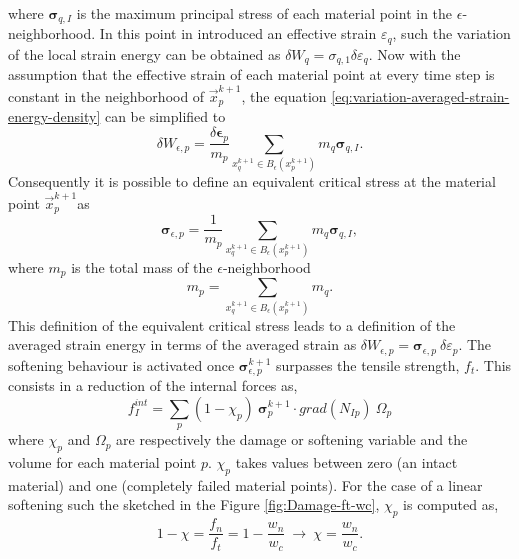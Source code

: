 \documentclass[preprint,12pt,a4paper]{elsarticle}
\newcommand{\tens}[1]{
  \ensuremath{\mathbf{{#1}}}
}
\newcommand\Grad[1]{grad({#1})}
\begin{document}
where $\tens{\sigma}_{q,I}$ is the maximum principal stress of each
material point in the $\epsilon$-neighborhood. In this point in
introduced an effective strain $\varepsilon_q$, such the variation of
the local strain energy can be obtained as $\delta W_q = \sigma_{q,1}
\delta\varepsilon_q$. Now with the assumption that the effective
strain of each material point at every time step is constant in the
neighborhood of $\vec{x}_p^{k+1}$, the equation 
\eqref{eq:variation-averaged-strain-energy-density} can be simplified
 to
\begin{equation}
  \label{eq:variation-averaged-strain-energy-density-simpli}
  \delta W_{\epsilon,p} =
  \frac{\delta \tens{\epsilon}_p}{m_p} \sum_{x_q^{k+1} \in
  B_{\epsilon}(x_p^{k+1})} m_q \tens{\sigma}_{q,I}. 
\end{equation}
Consequently it is possible to define an equivalent critical stress at the
material point $\vec{x}_p^{k+1}$as
\begin{equation}
  \label{eq:equivalent-critical-stress}
  \tens{\sigma}_{\epsilon,p} =
  \frac{1}{m_p} \sum_{x_q^{k+1} \in
  B_{\epsilon}(x_p^{k+1})} m_q \tens{\sigma}_{q,I}, 
\end{equation}
where $m_p$ is the total mass of the $\epsilon$-neighborhood
\begin{equation}
  \label{eq:averaged-mass}
  m_p = \sum_{x_q^{k+1} \in B_{\epsilon}(x_p^{k+1})} m_q.
\end{equation}
This definition of the equivalent critical stress leads to a
definition of the averaged strain energy in terms of the averaged
strain as $\delta W_{\epsilon,p} =
 \tens{\sigma}_{\epsilon,p}\ \delta\varepsilon_p$. The softening behaviour is
activated once $\tens{\sigma}_{\epsilon,p}^{k+1}$ surpasses the
tensile strength, $f_t$. This consists in a reduction of the internal
forces as,
 \begin{equation}
   \label{eq:f-int-damaged}
   f^{int}_I = \sum_p (1 - \chi_p)\ \tens{\sigma}_{p}^{k+1} \cdot
   \Grad{N_{Ip}}\ \Omega_p
 \end{equation}
where $\chi_p$ and $\Omega_p$ are respectively the damage or softening
variable and the volume for each material point $p$. $\chi_p$ takes
values between zero (an intact material) and one (completely failed
material points). For the case of a linear softening such the sketched in the Figure \ref{fig:Damage-ft-wc}, $\chi_p$ is computed as,
 \begin{equation}
   \label{eq:damaged-variable-chi}
   1 - \chi = \frac{f_n}{f_t} = 1 - \frac{w_n}{w_c}\ \rightarrow\ \chi
   = \frac{w_n}{w_c}.
 \end{equation}
\end{document}
